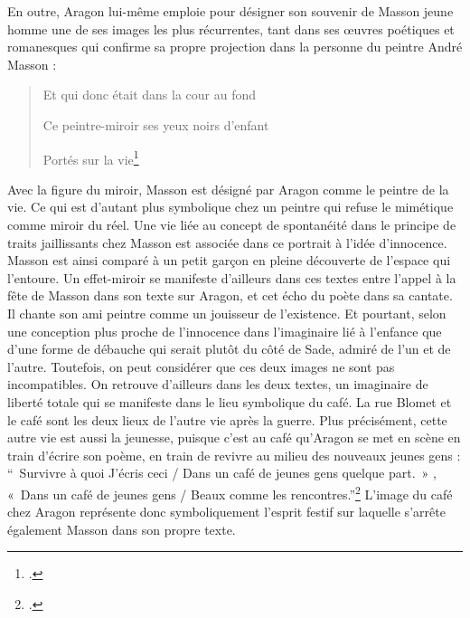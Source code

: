 	En outre, Aragon lui-même emploie pour désigner son souvenir de Masson jeune homme une de ses images les plus récurrentes, tant dans ses \oe{}uvres poétiques et romanesques qui confirme sa propre projection dans la personne du peintre André Masson : 

\begin{verse}
    
Et qui donc était dans la cour au fond

Ce peintre-miroir ses yeux noirs d’enfant

Portés sur la vie\footcite[p682]{ecritssurla}\end{verse}

	Avec la figure du miroir, Masson est désigné par Aragon comme le peintre de la vie. Ce qui est d’autant plus symbolique chez un peintre qui refuse le mimétique comme miroir du réel. Une vie  liée au concept de spontanéité dans le principe de traits jaillissants chez Masson est associée dans ce portrait à l’idée d’innocence. Masson est ainsi comparé à un petit garçon en pleine découverte de l’espace qui l’entoure. Un effet-miroir se manifeste d’ailleurs dans ces textes entre l’appel à la fête de Masson dans son texte sur Aragon, et cet écho du poète dans sa cantate. Il chante son ami peintre comme un jouisseur de l’existence. Et pourtant, selon une conception plus proche de l’innocence dans l’imaginaire lié à l’enfance que d’une forme de débauche qui serait plutôt du côté de Sade, admiré de l’un et de l’autre. Toutefois, on peut considérer que ces deux images ne sont pas incompatibles. On retrouve d’ailleurs dans les deux textes, un imaginaire de liberté totale qui se manifeste dans le lieu symbolique du café. La rue Blomet et le café sont les deux lieux de l’autre vie après la guerre. Plus précisément, cette autre vie est aussi la jeunesse, puisque c’est au café qu’Aragon se met en scène en train d’écrire son poème, en train de revivre au milieu des nouveaux jeunes gens : \enquote{ Survivre à quoi J’écris ceci / Dans un café de jeunes gens quelque part. » , « Dans un café de jeunes gens / Beaux comme les rencontres.}\footcite[p681]{ecritssurla} L’image du café chez Aragon représente donc symboliquement l’esprit festif sur laquelle s’arrête également Masson dans son propre texte. 

